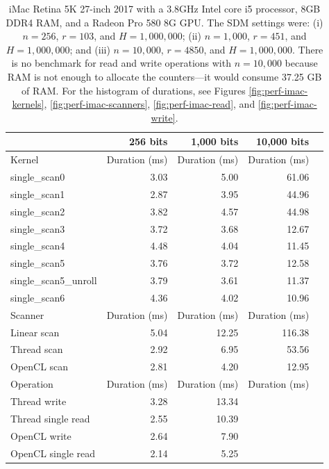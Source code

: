 

\begin{table}[!htb]
\centering
\begin{tabular}{lrrrr}
    \toprule
    & \textbf{256 bits} & \textbf{1,000 bits} & \textbf{10,000 bits} \\ \hline
    \hline
	Kernel & Duration (ms) & Duration (ms) & Duration (ms) \\ \hline
    single\_scan0 & 3.03 & 5.00 & 61.06 \\
    single\_scan1 & 2.87 & 3.95 & 44.96 \\
    single\_scan2 & 3.82 & 4.57 & 44.98 \\
    single\_scan3 & 3.72 & 3.68 & 12.67 \\
    single\_scan4 & 4.48 & 4.04 & 11.45 \\
    single\_scan5 & 3.76 & 3.72 & 12.58 \\
	single\_scan5\_unroll & 3.79 & 3.61 & 11.37 \\
	single\_scan6 & 4.36 & 4.02 & 10.96 \\ \hline
    \hline
	Scanner & Duration (ms) & Duration (ms) & Duration (ms) \\ \hline
    Linear scan & 5.04 & 12.25 & 116.38 \\
    Thread scan & 2.92 &  6.95 &  53.56 \\
    OpenCL scan & 2.81 &  4.20 &  12.95 \\ \hline
    \hline
	Operation & Duration (ms) & Duration (ms) & Duration (ms) \\ \hline
    Thread write       & 3.28 & 13.34 \\
    Thread single read & 2.55 & 10.39 \\
    OpenCL write       & 2.64 &  7.90 \\
    OpenCL single read & 2.14 &  5.25 \\
    \bottomrule
\end{tabular}
\caption{iMac Retina 5K 27-inch 2017 with a 3.8GHz Intel core i5 processor, 8GB DDR4 RAM, and a Radeon Pro 580 8G GPU. The SDM settings were: (i) $n=256$, $r=103$, and $H=1,000,000$; (ii) $n=1,000$, $r=451$, and $H=1,000,000$; and (iii) $n=10,000$, $r=4850$, and $H=1,000,000$. There is no benchmark for read and write operations with $n=10,000$ because RAM is not enough to allocate the counters---it would consume 37.25 GB of RAM.
For the histogram of durations, see Figures \ref{fig:perf-imac-kernels}, \ref{fig:perf-imac-scanners}, \ref{fig:perf-imac-read}, and \ref{fig:perf-imac-write}.
\label{tab:perf-imac}}
\end{table}


